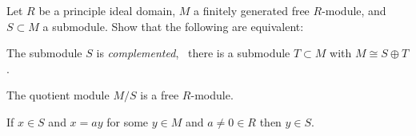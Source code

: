 Let $R$ be a principle ideal domain, $M$ a finitely generated free
$R$-module, and $S\subset M$ a submodule.  Show that the following are
equivalent:
\begin{alist}
\item The submodule $S$ is \emph{complemented}, \ie\ there is a
submodule $T\subset M$ with $M\cong S \oplus T$.
\item The quotient module $M/S$ is a free $R$-module.
\item If $x\in S$ and $x=ay$ for some $y\in M$ and $a\neq 0\in R$ then
$y\in S$.
\end{alist}
